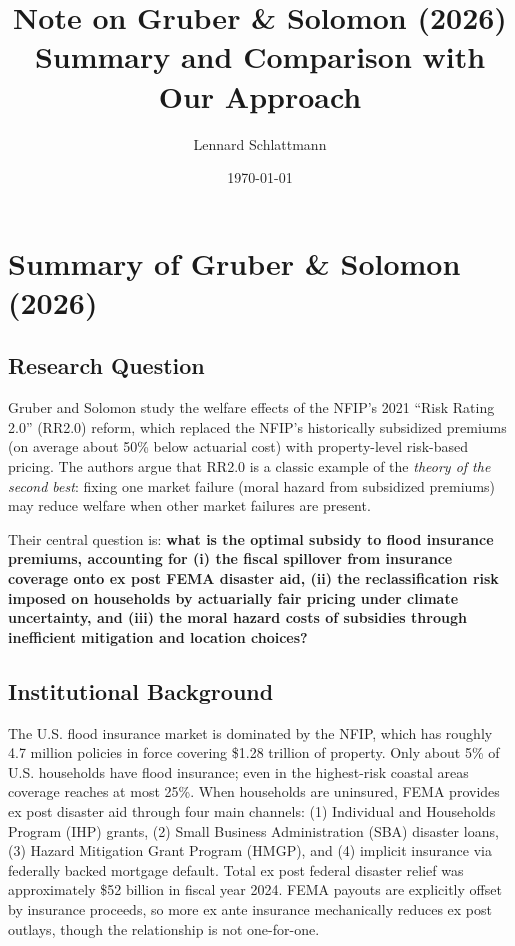 \documentclass[12pt]{article}
\title{Note on Gruber \& Solomon (2026)\\
\large Summary and Comparison with Our Approach}
\author{Lennard Schlattmann}
\date{\today}
\begin{document}
\maketitle
\onehalfspacing

\tableofcontents
\newpage

\section{Summary of Gruber \& Solomon (2026)}

\subsection{Research Question}

Gruber and Solomon study the welfare effects of the NFIP's 2021 ``Risk Rating 2.0'' (RR2.0) reform, which replaced the NFIP's historically subsidized premiums (on average about 50\% below actuarial cost) with property-level risk-based pricing. The authors argue that RR2.0 is a classic example of the \emph{theory of the second best}: fixing one market failure (moral hazard from subsidized premiums) may reduce welfare when other market failures are present.

Their central question is: \textbf{what is the optimal subsidy to flood insurance premiums, accounting for (i) the fiscal spillover from insurance coverage onto ex post FEMA disaster aid, (ii) the reclassification risk imposed on households by actuarially fair pricing under climate uncertainty, and (iii) the moral hazard costs of subsidies through inefficient mitigation and location choices?}

\subsection{Institutional Background}

The U.S. flood insurance market is dominated by the NFIP, which has roughly 4.7 million policies in force covering \$1.28 trillion of property. Only about 5\% of U.S. households have flood insurance; even in the highest-risk coastal areas coverage reaches at most 25\%. When households are uninsured, FEMA provides ex post disaster aid through four main channels: (1) Individual and Households Program (IHP) grants, (2) Small Business Administration (SBA) disaster loans, (3) Hazard Mitigation Grant Program (HMGP), and (4) implicit insurance via federally backed mortgage default. Total ex post federal disaster relief was approximately \$52 billion in fiscal year 2024. FEMA payouts are explicitly offset by insurance proceeds, so more ex ante insurance mechanically reduces ex post outlays, though the relationship is not one-for-one.
\end{document}
